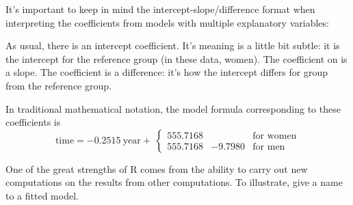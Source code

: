 It's important to keep in mind the intercept-slope/difference format
when interpreting the coefficients from models with multiple
explanatory variables:
\begin{knitrout}
\end{knitrout}

As usual, there is an intercept coefficient.  It's meaning is a little bit
subtle: it is the intercept for the reference group (in these data, women).  The coefficient
on  is a slope.  The  coefficient is a difference:
it's how the intercept differs for group  from the reference
group.  

In traditional mathematical notation, the model formula corresponding
to these coefficients is
$$
\mbox{time} = - 0.2515 \ \mbox{year}  + \ \left\{ \begin{array}{rll}
  555.7168  &  & \mbox{for women}\\
555.7168  &  - 9.7980  & \mbox{for men}
\end{array}\right.
$$


One of the great strengths of R comes from the ability to carry out
new computations on the results from other computations.  To
illustrate, give a name to a fitted model.
\begin{knitrout}
\end{knitrout}


